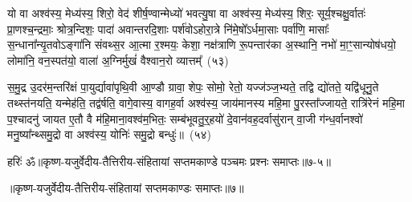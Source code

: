 यो वा अश्व॑स्य॒ मेध्य॑स्य॒ शिरो॒ वेद॑ शीर्\mbox{}ष॒ण्वान्मेध्यो॑ भवत्यु॒षा वा अश्व॑स्य॒ मेध्य॑स्य॒ शिरः॒ सूर्य॒श्चक्षु॒र्वातः॑ प्रा॒णश्च॒न्द्रमाः॒ श्रोत्र॒न्दिशः॒ पादा॑ अवान्तरदि॒शाः पर्\mbox{}श॑वो\-ऽहोरा॒त्रे नि॑मे॒षो᳚\-ऽर्धमा॒साः पर्वा॑णि॒ मासाः᳚ स॒न्धाना᳚न्यृ॒तवो\-ऽङ्गा॑नि संवथ्स॒र आ॒त्मा र॒श्मयः॒ केशा॒ नक्ष॑त्राणि रू॒पन्तार॑का अ॒स्थानि॒ नभो॑ मा॒ꣳ॒सान्योष॑धयो॒ लोमा॑नि॒ वन॒स्पत॑यो॒ वाला॑ अ॒ग्निर्मुखं॑ वैश्वान॒रो व्यात्तम्᳚~(५३)\ip

स॒मु॒द्र उ॒दर॑म॒न्तरि॑क्षं पा॒युर्द्यावा॑\-पृथि॒वी आ॒ण्डौ ग्रावा॒ शेपः॒ सोमो॒ रेतो॒ यज्ज॑ञ्ज॒भ्यते॒ तद्वि द्यो॑तते॒ यद्वि॑धूनु॒ते तथ्स्त॑नयति॒ यन्मेह॑ति॒ तद्व॑र्\mbox{}षति॒ वागे॒वास्य॒ वागह॒र्वा अश्व॑स्य॒ जाय॑मानस्य महि॒मा पु॒रस्ता᳚ज्जायते॒ रात्रि॑रेनं महि॒मा प॒श्चादनु॑ जायत ए॒तौ वै म॑हि॒माना॒वश्व॑म॒भितः॒ सम्ब॑भूवतु॒र्॒\mbox{}हयो॑ दे॒वान॑वह॒दर्वासु॑रान् वा॒जी ग॑न्ध॒र्वानश्वो॑ मनु॒ष्या᳚न्थ्समु॒द्रो वा अश्व॑स्य॒ योनिः॑ समु॒द्रो बन्धुः॑॥~(५४)\ip

{\anuvakamend[{व्यात्त॑मवह॒द्द्वाद॑श च}]}%

{हरिः॑ ॐ}{॥कृष्ण-यजुर्वेदीय-तैत्तिरीय-संहितायां सप्तमकाण्डे पञ्चमः प्रश्नः समाप्तः॥७-५॥}

\centerline{॥कृष्ण-यजुर्वेदीय-तैत्तिरीय-संहितायां सप्तमकाण्डः समाप्तः॥७॥}

\medskip

\centerline{\hyperref[sec:startkanda7]{\closesection}}


